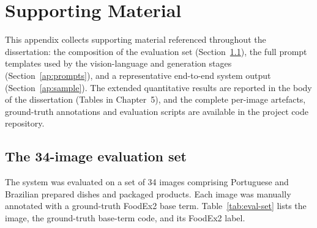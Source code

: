 \chapter{Supporting Material} \label{ap:support}

This appendix collects supporting material referenced throughout the dissertation:
the composition of the evaluation set (Section~\ref{ap:dataset}), the full prompt
templates used by the vision-language and generation stages
(Section~\ref{ap:prompts}), and a representative end-to-end system output
(Section~\ref{ap:sample}). The extended quantitative results are reported in the
body of the dissertation (Tables in Chapter~5), and the complete per-image
artefacts, ground-truth annotations and evaluation scripts are available in the
project code repository.

\section{The 34-image evaluation set}\label{ap:dataset}

The system was evaluated on a set of 34 images comprising Portuguese and Brazilian
prepared dishes and packaged products. Each image was manually annotated with a
ground-truth FoodEx2 base term. Table~\ref{tab:eval-set} lists the image, the
ground-truth base-term code, and its FoodEx2 label.


